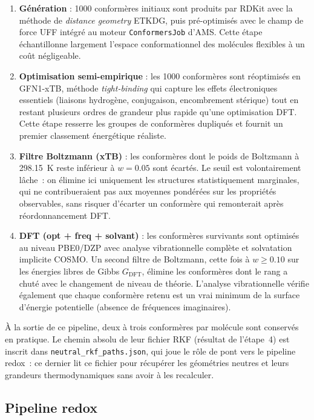 \begin{enumerate}[noitemsep]
    \item \textbf{Génération} : 1000 conformères initiaux sont produits par RDKit avec la méthode de \emph{distance geometry} ETKDG, puis pré-optimisés avec le champ de force UFF intégré au moteur \texttt{ConformersJob} d'AMS. Cette étape échantillonne largement l'espace conformationnel des molécules flexibles à un coût négligeable.
    \item \textbf{Optimisation semi-empirique} : les 1000 conformères sont réoptimisés en GFN1-xTB, méthode \emph{tight-binding} qui capture les effets électroniques essentiels (liaisons hydrogène, conjugaison, encombrement stérique) tout en restant plusieurs ordres de grandeur plus rapide qu'une optimisation DFT. Cette étape resserre les groupes de conformères dupliqués et fournit un premier classement énergétique réaliste.
    \item \textbf{Filtre Boltzmann (xTB)} : les conformères dont le poids de Boltzmann à \SI{298.15}{K} reste inférieur à $w = 0.05$ sont écartés. Le seuil est volontairement lâche~: on élimine ici uniquement les structures statistiquement marginales, qui ne contribueraient pas aux moyennes pondérées sur les propriétés observables, sans risquer d'écarter un conformère qui remonterait après réordonnancement DFT.
    \item \textbf{DFT (opt + freq + solvant)} : les conformères survivants sont optimisés au niveau PBE0/DZP avec analyse vibrationnelle complète et solvatation implicite COSMO. Un second filtre de Boltzmann, cette fois à $w \geq 0.10$ sur les énergies libres de Gibbs $G_{\text{DFT}}$, élimine les conformères dont le rang a chuté avec le changement de niveau de théorie. L'analyse vibrationnelle vérifie également que chaque conformère retenu est un vrai minimum de la surface d'énergie potentielle (absence de fréquences imaginaires).
\end{enumerate}

À la sortie de ce pipeline, deux à trois conformères par molécule sont conservés en pratique. Le chemin absolu de leur fichier RKF (résultat de l'étape~4) est inscrit dans \texttt{neutral\_rkf\_paths.json}, qui joue le rôle de pont vers le pipeline redox~: ce dernier lit ce fichier pour récupérer les géométries neutres et leurs grandeurs thermodynamiques sans avoir à les recalculer.

\subsection{Pipeline redox}

